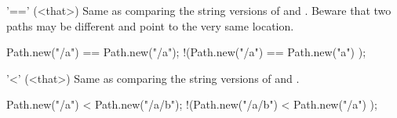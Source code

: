 \begin{urbiscriptapi}
\item['=='](<that>)%
  Same as comparing the string versions of \this and
  .  Beware that two paths may be different and point to the
  very same location.
\begin{urbiassert}
  Path.new("/a")  == Path.new("/a");
!(Path.new("/a")  == Path.new("a")  );
\end{urbiassert}

\item['<'](<that>)%
  Same as comparing the string versions of \this and
  .
\begin{urbiassert}
  Path.new("/a")   < Path.new("/a/b");
!(Path.new("/a/b") < Path.new("/a")  );
\end{urbiassert}

\end{urbiscriptapi}


